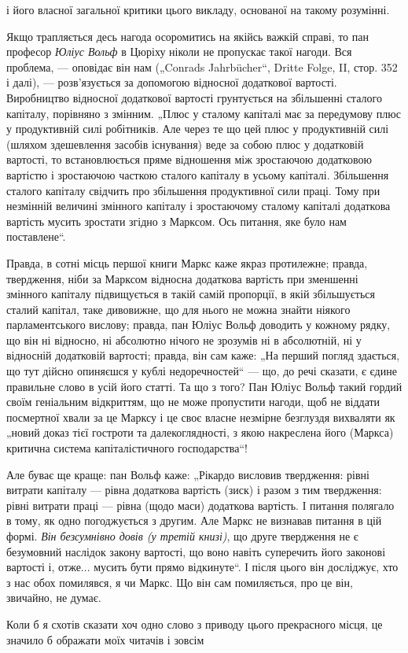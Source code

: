 \parcont{}  %
і його власної загальної критики цього викладу, основаної на
такому розумінні.

Якщо трапляється десь нагода осоромитись на якійсь важкій
справі, то пан професор \emph{Юліус Вольф} в Цюріху ніколи не пропускає
такої нагоди. Вся проблема, — оповідає він нам („Conrads
Jahrbücher“, Dritte Folge, II, стор. 352 і далі), — розв’язується за допомогою
відносної додаткової вартості. Виробництво відносної
додаткової вартості грунтується на збільшенні сталого капіталу,
порівняно з змінним. „Плюс у сталому капіталі має за передумову
плюс у продуктивній силі робітників. Але через те що цей
плюс у продуктивній силі (шляхом здешевлення засобів існування)
веде за собою плюс у додатковій вартості, то встановлюється
пряме відношення між зростаючою додатковою вартістю
і зростаючою часткою сталого капіталу в усьому капіталі.
Збільшення сталого капіталу свідчить про збільшення
продуктивної сили праці. Тому при незмінній величині змінного
капіталу і зростаючому сталому капіталі додаткова вартість
мусить зростати згідно з Марксом. Ось питання, яке було нам
поставлене“.

Правда, в сотні місць першої книги Маркс каже якраз протилежне;
правда, твердження, ніби за Марксом відносна додаткова
вартість при зменшенні змінного капіталу підвищується в такій
самій пропорції, в якій збільшується сталий капітал, таке дивовижне,
що для нього не можна знайти ніякого парламентського
вислову; правда, пан Юліус Вольф доводить у кожному рядку,
що він ні відносно, ні абсолютно нічого не зрозумів ні в абсолютній,
ні у відносній додатковій вартості; правда, він сам
каже: „На перший погляд здається, що тут дійсно опиняєшся
у кублі недоречностей“ — що, до речі сказати, є єдине правильне
слово в усій його статті. Та що з того? Пан Юліус
Вольф такий гордий своїм геніальним відкриттям, що не може
пропустити нагоди, щоб не віддати посмертної хвали за це
Марксу і це своє власне незмірне безглуздя вихваляти як „новий
доказ тієї гостроти та далекоглядності, з якою накреслена
його (Маркса) критична система капіталістичного господарства“!

Але буває ще краще: пан Вольф каже: „Рікардо висловив
твердження: рівні витрати капіталу — рівна додаткова вартість
(зиск) і разом з тим твердження: рівні витрати праці — рівна
(щодо маси) додаткова вартість. І питання полягало в тому,
як одно погоджується з другим. Але Маркс не визнавав питання
в цій формі. \emph{Він безсумнівно довів (у третій книзі)},
що друге твердження не є безумовний наслідок закону вартості,
що воно навіть суперечить його законові вартості і, отже...
мусить бути прямо відкинуте“. І після цього він досліджує, хто
з нас обох помилявся, я чи Маркс. Що він сам помиляється,
про це він, звичайно, не думає.

Коли б я схотів сказати хоч одно слово з приводу цього
прекрасного місця, це значило б ображати моїх читачів і зовсім
\parbreak{}  %
